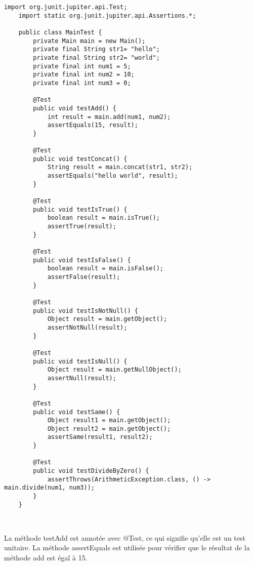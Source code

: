 \begin{lstlisting}[style=monstyle]
	import org.junit.jupiter.api.Test;
	import static org.junit.jupiter.api.Assertions.*;
	
	public class MainTest {
		private Main main = new Main();
		private final String str1= "hello";
		private final String str2= "world";
		private final int num1 = 5;
		private final int num2 = 10;
		private final int num3 = 0;
		
		@Test
		public void testAdd() {
			int result = main.add(num1, num2);
			assertEquals(15, result);
		}
		
		@Test
		public void testConcat() {
			String result = main.concat(str1, str2);
			assertEquals("hello world", result);
		}
		
		@Test
		public void testIsTrue() {
			boolean result = main.isTrue();
			assertTrue(result);
		}
		
		@Test
		public void testIsFalse() {
			boolean result = main.isFalse();
			assertFalse(result);
		}
		
		@Test
		public void testIsNotNull() {
			Object result = main.getObject();
			assertNotNull(result);
		}
		
		@Test
		public void testIsNull() {
			Object result = main.getNullObject();
			assertNull(result);
		}
		
		@Test
		public void testSame() {
			Object result1 = main.getObject();
			Object result2 = main.getObject();
			assertSame(result1, result2);
		}
		
		@Test
		public void testDivideByZero() {
			assertThrows(ArithmeticException.class, () -> main.divide(num1, num3));
		}
	}
	
	
\end{lstlisting}
La méthode testAdd est annotée avec @Test, ce qui signifie qu'elle est un test unitaire. La méthode assertEquals est utilisée pour vérifier que le résultat de la méthode add est égal à 15.